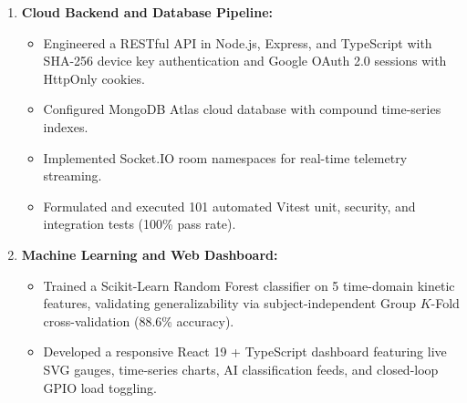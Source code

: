 \begin{enumerate}
    \item \textbf{Cloud Backend and Database Pipeline:}
    \begin{itemize}
        \item Engineered a RESTful API in Node.js, Express, and TypeScript with SHA-256 device key authentication and Google OAuth 2.0 sessions with HttpOnly cookies.
        \item Configured MongoDB Atlas cloud database with compound time-series indexes.
        \item Implemented Socket.IO room namespaces for real-time telemetry streaming.
        \item Formulated and executed 101 automated Vitest unit, security, and integration tests (100\% pass rate).
    \end{itemize}

    \item \textbf{Machine Learning and Web Dashboard:}
    \begin{itemize}
        \item Trained a Scikit-Learn Random Forest classifier on 5 time-domain kinetic features, validating generalizability via subject-independent Group $K$-Fold cross-validation (88.6\% accuracy).
        \item Developed a responsive React 19 + TypeScript dashboard featuring live SVG gauges, time-series charts, AI classification feeds, and closed-loop GPIO load toggling.
    \end{itemize}
\end{enumerate}

\vspace{0.3in}

\begin{center}
\end{center}
\clearpage
